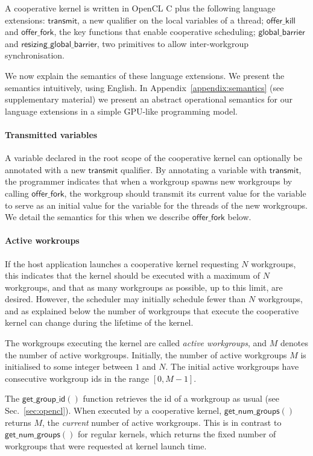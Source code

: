 \documentclass[numbers,nocopyrightspace,10pt]{sigplanconf}
\newcommand{\mysec}{Sec.~}
\newcommand{\transmit}{\mathsf{transmit}}
\newcommand{\offerfork}{\mathsf{offer\_fork}}
\newcommand{\offerkill}{\mathsf{offer\_kill}}
\newcommand{\globalbarrier}{\mathsf{global\_barrier}}
\newcommand{\resizingglobalbarrier}{\mathsf{resizing\_global\_barrier}}
\newcommand{\getgroupid}{\mathsf{get\_group\_id}}
\newcommand{\getnumgroups}{\mathsf{get\_num\_groups}}
\begin{document}
A cooperative kernel is written in OpenCL C plus the following
language extensions: $\transmit$, a
new qualifier on the local variables of a thread; $\offerkill$ and
$\offerfork$, the key functions that enable cooperative scheduling;
$\globalbarrier$ and $\resizingglobalbarrier$, two primitives to allow
inter-workgroup synchronisation.

We now explain the semantics of these language extensions.  We present the semantics intuitively, using English.
In Appendix~\ref{appendix:semantics} (see supplementary material) we present an abstract operational semantics for our language extensions in a simple GPU-like programming model.

\paragraph{Transmitted variables}

A variable declared in the root scope of the cooperative kernel can
optionally be annotated with a new $\transmit$ qualifier.  By
annotating a variable with $\transmit$, the programmer indicates that
when a workgroup spawns new workgroups by calling $\offerfork$, the
workgroup should transmit its current value for the variable to serve
as an initial value for the variable for the threads of the new workgroups.  We detail the semantics
for this when we describe $\offerfork$ below.

\paragraph{Active workroups}

If the host application launches a cooperative kernel requesting $N$
workgroups, this indicates that the kernel should be executed with a
maximum of $N$ workgroups, and that as many workgroups as possible, up
to this limit, are desired.  However, the scheduler may initially
schedule fewer than $N$ workgroups, and as explained below the number
of workgroups that execute the cooperative kernel can change during
the lifetime of the kernel.

The workgroups executing the kernel are called \emph{active
  workgroups}, and $M$ denotes the number of active workgroups.
Initially, the number of active workgroups $M$ is initialised to some
integer between $1$ and $N$.  The initial active workgroups have
consecutive workgroup ids in the range $[0, M-1]$.

The $\getgroupid()$ function retrieves the id of a workgroup as usual
(see \mysec\ref{sec:opencl}).  When executed by a cooperative
kernel, $\getnumgroups()$ returns $M$, the \emph{current} number of
active workgroups.  This is in contrast to $\getnumgroups()$ for
regular kernels, which returns the fixed number of workgroups that
were requested at kernel launch time.
\end{document}
